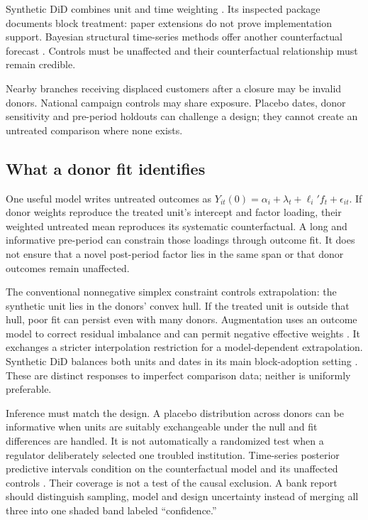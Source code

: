 Synthetic DiD combines unit and time weighting \citep{synthdid2021}.
Its inspected package documents block treatment: paper extensions do not
prove implementation support. Bayesian structural time-series methods offer
another counterfactual forecast \citep{brodersen2015}. Controls must be
unaffected and their counterfactual relationship must remain credible.

Nearby branches receiving displaced customers after a closure may be
invalid donors. National campaign controls may share exposure. Placebo
dates, donor sensitivity and pre-period holdouts can challenge a design;
they cannot create an untreated comparison where none exists.

\subsection{What a donor fit identifies}
One useful model writes untreated outcomes as
$Y_{it}(0)=\alpha_i+\lambda_t+\ell_i'f_t+\epsilon_{it}$.
If donor weights reproduce the treated unit's intercept and factor loading,
their weighted untreated mean reproduces its systematic counterfactual.
A long and informative pre-period can constrain those loadings through
outcome fit. It does not ensure that a novel post-period factor lies in
the same span or that donor outcomes remain unaffected.

The conventional nonnegative simplex constraint controls extrapolation:
the synthetic unit lies in the donors' convex hull. If the treated unit is
outside that hull, poor fit can persist even with many donors. Augmentation
uses an outcome model to correct residual imbalance and can permit negative
effective weights \citep{benmichael2021}. It exchanges a stricter interpolation
restriction for a model-dependent extrapolation. Synthetic DiD balances
both units and dates in its main block-adoption setting
\citep{synthdid2021}. These are distinct responses to imperfect comparison
data; neither is uniformly preferable.

Inference must match the design. A placebo distribution across donors can
be informative when units are suitably exchangeable under the null and
fit differences are handled. It is not automatically a randomized test
when a regulator deliberately selected one troubled institution.
Time-series posterior predictive intervals condition on the counterfactual
model and its unaffected controls \citep{brodersen2015}. Their coverage is
not a test of the causal exclusion. A bank report should distinguish
sampling, model and design uncertainty instead of merging all three into
one shaded band labeled ``confidence.''

